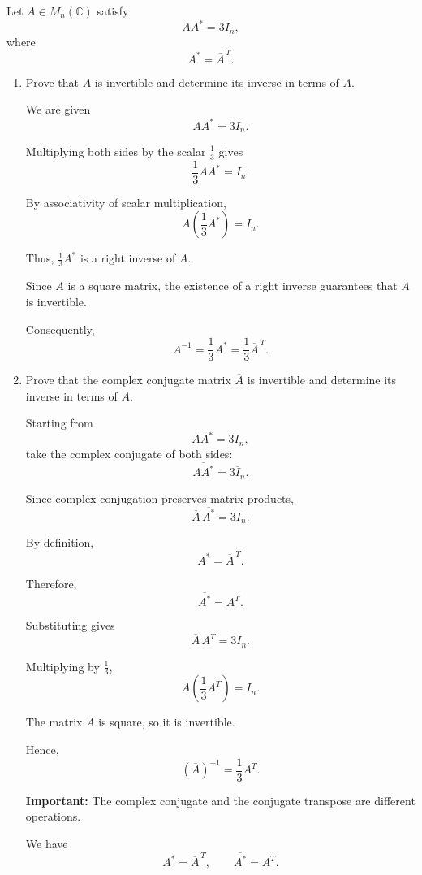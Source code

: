 
\item Let $A\in M_n(\mathbb{C})$ satisfy
$$
AA^*=3I_n,
$$
where
$$
A^*=\overline{A}^{\,T}.
$$

\begin{enumerate}[label=\alph*)]

\item Prove that $A$ is invertible and determine its inverse in terms of $A$.

\begin{answer}
    We are given
    $$
    AA^*=3I_n.
    $$

    Multiplying both sides by the scalar $\frac13$ gives
    $$
    \frac13AA^*=I_n.
    $$

    By associativity of scalar multiplication,
    $$
    A\left(\frac13A^*\right)=I_n.
    $$

    Thus, $\frac13A^*$ is a right inverse of $A$.

    Since $A$ is a square matrix, the existence of a right inverse
    guarantees that $A$ is invertible.

    Consequently,
    $$
    \boxed{
    A^{-1}=\frac13A^*
    =\frac13\overline{A}^{\,T}.
    }
    $$

\end{answer}

\item Prove that the complex conjugate matrix $\overline{A}$
is invertible and determine its inverse in terms of $A$.

\begin{answer}
    Starting from
    $$
    AA^*=3I_n,
    $$
    take the complex conjugate of both sides:
    $$
    \overline{AA^*}
    =\overline{3I_n}.
    $$

    Since complex conjugation preserves matrix products,
    $$
    \overline{A}\,
    \overline{A^*}=3I_n.
    $$

    By definition,
    $$
    A^*=\overline{A}^{\,T}.
    $$

    Therefore,
    $$
    \overline{A^*}=A^T.
    $$

    Substituting gives
    $$
    \overline{A}\,A^T=3I_n.
    $$

    Multiplying by $\frac13$,
    $$
    \overline{A}
    \left(\frac13A^T\right)=I_n.
    $$

    The matrix $\overline{A}$ is square, so it is invertible.

    Hence,
    $$
    \boxed{
    (\overline{A})^{-1}
    =\frac13A^T.
    }
    $$

    {\color{red}
    \textbf{Important:} The complex conjugate and the conjugate transpose
    are different operations.

    We have
    $$
    A^*=\overline{A}^{\,T},
    \qquad
    \overline{A^*}=A^T.
    $$
}
\end{answer}

\end{enumerate}
